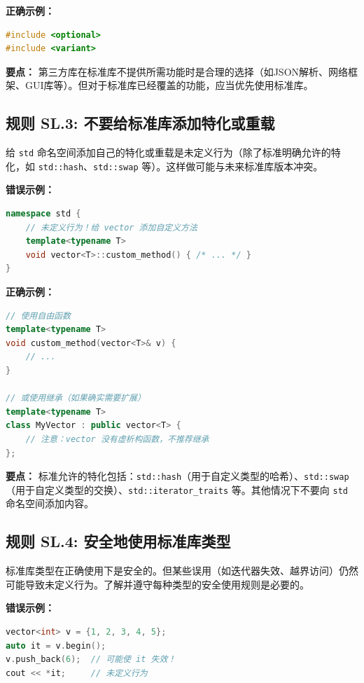 \textbf{正确示例：}

\begin{lstlisting}[language=C++]
#include <optional>
#include <variant>
\end{lstlisting}

\textbf{要点：} 第三方库在标准库不提供所需功能时是合理的选择（如JSON解析、网络框架、GUI库等）。但对于标准库已经覆盖的功能，应当优先使用标准库。

\subsection*{\textbf{规则 SL.3:} 不要给标准库添加特化或重载}

给 \texttt{std} 命名空间添加自己的特化或重载是未定义行为（除了标准明确允许的特化，如 \texttt{std::hash}、\texttt{std::swap} 等）。这样做可能与未来标准库版本冲突。

\textbf{错误示例：}

\begin{lstlisting}[language=C++]
namespace std {
    // 未定义行为！给 vector 添加自定义方法
    template<typename T>
    void vector<T>::custom_method() { /* ... */ }
}
\end{lstlisting}

\textbf{正确示例：}

\begin{lstlisting}[language=C++]
// 使用自由函数
template<typename T>
void custom_method(vector<T>& v) {
    // ...
}

// 或使用继承（如果确实需要扩展）
template<typename T>
class MyVector : public vector<T> {
    // 注意：vector 没有虚析构函数，不推荐继承
};
\end{lstlisting}

\textbf{要点：} 标准允许的特化包括：\texttt{std::hash}（用于自定义类型的哈希）、\texttt{std::swap}（用于自定义类型的交换）、\texttt{std::iterator\_traits} 等。其他情况下不要向 \texttt{std} 命名空间添加内容。

\subsection*{\textbf{规则 SL.4:} 安全地使用标准库类型}

标准库类型在正确使用下是安全的。但某些误用（如迭代器失效、越界访问）仍然可能导致未定义行为。了解并遵守每种类型的安全使用规则是必要的。

\textbf{错误示例：}

\begin{lstlisting}[language=C++]
vector<int> v = {1, 2, 3, 4, 5};
auto it = v.begin();
v.push_back(6);  // 可能使 it 失效！
cout << *it;     // 未定义行为
\end{lstlisting}

